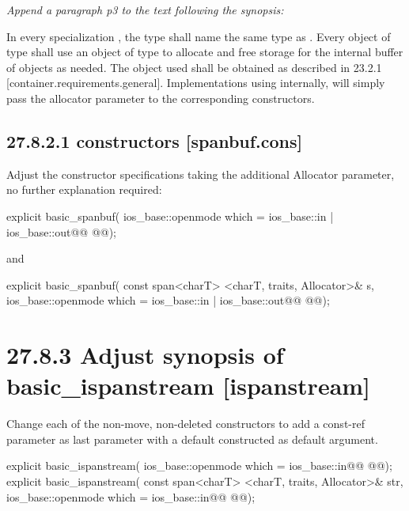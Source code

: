 \documentclass[ebook,11pt,article]{memoir}
\begin{document}
\textit{Append a paragraph p3 to the text following the synopsis:}

\begin{insrt}
\pnum
In every specialization , the type  shall name the same type as . Every object of type  shall use an object of type  to allocate and free storage for the internal buffer of  objects as needed. The  object used shall be obtained as described in 23.2.1 [container.requirements.general].
\enternote
Implementations using  internally, will simply pass the allocator parameter to the corresponding  constructors.
\exitnote
\end{insrt}

\subsection{27.8.2.1  constructors [spanbuf.cons]}
Adjust the constructor specifications taking the additional Allocator parameter, no further explanation required:

\begin{itemdecl}
explicit basic_spanbuf(
  ios_base::openmode which = ios_base::in | ios_base::out@\ins{,}@
  @@);
\end{itemdecl}

and

\begin{itemdecl}
explicit basic_spanbuf(
  const span<charT> <charT, traits, Allocator>& s,
  ios_base::openmode which = ios_base::in | ios_base::out@\ins{,}@
  @@);
\end{itemdecl}

\section{27.8.3 Adjust synopsis of basic\_ispanstream [ispanstream]}
Change each of the non-move, non-deleted constructors to add a const-ref  parameter as last parameter with a default constructed  as default argument. 
\begin{codeblock}
explicit basic_ispanstream(
             ios_base::openmode which = ios_base::in@\ins{,}@
             @@);
explicit basic_ispanstream(
             const span<charT> <charT, traits, Allocator>& str,
             ios_base::openmode which = ios_base::in@\ins{,}@
             @@);
\end{codeblock}
\end{document}
